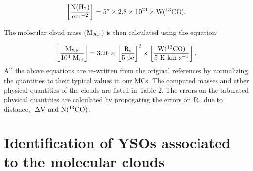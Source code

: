 \documentclass[iop]{emulateapj}
\begin{document}
\begin{equation}
\rm
\left[ \frac {N(H_2)} {cm^{-2}} \right] = 57\times2.8\times10^{20}\times W(^{13}CO).
\end{equation}

The molecular cloud mass (M$_{\rm XF}$) is then calculated using the equation:

\begin{equation}
\rm
\left[\frac{M_{XF}}{10^4~M_{\odot}}\right] = 
\rm 3.26\times\left[\frac{R_e}{5~pc}\right]^2 \times \left[\frac{W(^{13}CO)}{5~K~km~s^{-1}}\right]. 
\end{equation}
%
All the above equations are re-written from the original references by
normalizing the quantities to their typical values in our MCs.
The computed masses and other physical quantities of the clouds are listed in Table 2. 
The errors on the tabulated physical quantities are calculated by propogating
the errors on $\rm R_e$ due to distance, $\rm ~\Delta V~and~N(^{13}CO)$.



\section{Identification of YSOs associated to the molecular clouds}
\end{document}
